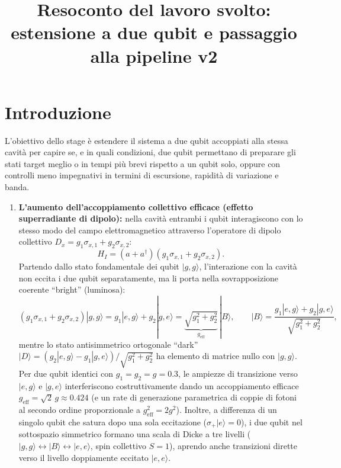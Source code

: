 \documentclass[11pt,a4paper]{article}
\title{\textbf{Resoconto del lavoro svolto:\\estensione a due qubit e passaggio alla pipeline v2}}
\date{}
\begin{document}
\maketitle

\section{Introduzione}

\noindent
L'obiettivo dello stage è estendere il sistema a due qubit accoppiati alla stessa cavità per capire se, e in quali condizioni, due qubit permettano di preparare gli stati target meglio o in tempi più brevi rispetto a un qubit solo, oppure con controlli meno impegnativi in termini di escursione, rapidità di variazione e banda.

\begin{enumerate}
    \item \textbf{L'aumento dell'accoppiamento collettivo efficace (effetto superradiante di dipolo):} nella cavità entrambi i qubit interagiscono con lo stesso modo del campo elettromagnetico attraverso l'operatore di dipolo collettivo $D_x = g_1 \sigma_{x,1} + g_2 \sigma_{x,2}$:
    \begin{equation}
        H_I = (a + a^\dagger)\left(g_1 \sigma_{x,1} + g_2 \sigma_{x,2}\right).
    \end{equation}
    Partendo dallo stato fondamentale dei qubit $|g,g\rangle$, l'interazione con la cavità non eccita i due qubit separatamente, ma li porta nella sovrapposizione coerente ``bright'' (luminosa):
    \begin{equation}
        \left(g_1 \sigma_{x,1} + g_2 \sigma_{x,2}\right)|g,g\rangle = g_1 |e,g\rangle + g_2 |g,e\rangle = \underbrace{\sqrt{g_1^2 + g_2^2}}_{g_{\text{eff}}}\,|B\rangle, \qquad |B\rangle = \frac{g_1 |e,g\rangle + g_2 |g,e\rangle}{\sqrt{g_1^2 + g_2^2}},
    \end{equation}
    mentre lo stato antisimmetrico ortogonale ``dark'' $|D\rangle = (g_2|e,g\rangle - g_1|g,e\rangle)/\sqrt{g_1^2+g_2^2}$ ha elemento di matrice nullo con $|g,g\rangle$. Per due qubit identici con $g_1 = g_2 = g = 0.3$, le ampiezze di transizione verso $|e,g\rangle$ e $|g,e\rangle$ interferiscono costruttivamente dando un accoppiamento efficace $g_{\text{eff}} = \sqrt{2}\,g \approx 0.424$ (e un rate di generazione parametrica di coppie di fotoni al secondo ordine proporzionale a $g_{\text{eff}}^2 = 2g^2$). Inoltre, a differenza di un singolo qubit che satura dopo una sola eccitazione ($\sigma_+|e\rangle = 0$), i due qubit nel sottospazio simmetrico formano una scala di Dicke a tre livelli ($|g,g\rangle \leftrightarrow |B\rangle \leftrightarrow |e,e\rangle$, spin collettivo $S=1$), aprendo anche transizioni dirette verso il livello doppiamente eccitato $|e,e\rangle$.

\end{enumerate}
\end{document}
